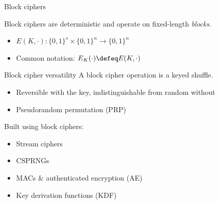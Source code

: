 \begin{frame}{Block ciphers}
\begin{center}
  \end{center}

  \pause
  Block ciphers are deterministic and operate on fixed-length \emph{blocks}.
  \begin{itemize}[<+(1)->]
    \item $E(K, \cdot) : \{0, 1\}^s \times \{0, 1\}^n \to \{0, 1\}^n$
    \item Common notation: $E_K(\cdot) \defeq E(K, \cdot)$
  \end{itemize}
\end{frame}

\begin{frame}{Block cipher versatility}
  A block cipher operation is a keyed shuffle.
  \begin{itemize}[<+(1)->]
    \item Reversible with the key, indistinguishable from random without
    \item Pseudorandom permutation (PRP)
  \end{itemize}

  \vspace*{1em}

  \pause
  Built using block ciphers:
  \begin{itemize}[<+(1)->]
    \item Stream ciphers
    \item CSPRNGs
    \item MACs \& authenticated encryption (AE)
    \item Key derivation functions (KDF)
  \end{itemize}
\end{frame}

